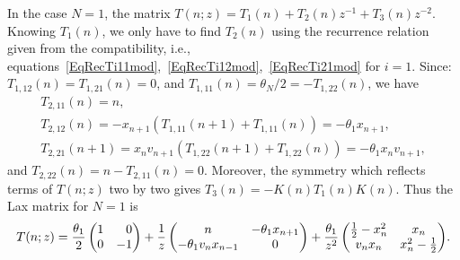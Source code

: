 \documentclass[pdftex]{sigma}%
\numberwithin{equation}{section}
\begin{document}
	\begin{Example} In the case $N=1$, the matrix $T(n;z)=T_1(n)+T_2(n)z^{-1}+T_3(n)z^{-2}$. Knowing $T_1(n)$, we only have to find $T_2(n)$ using the recurrence relation given from the compatibility, i.e., equations~\eqref{EqRecTi11mod},~\eqref{EqRecTi12mod},~\eqref{EqRecTi21mod} for $i=1$.
		Since: $T_{1,12}(n)=T_{1,21}(n)=0$, and $T_{1,11}(n)=\theta_N/2= -T_{1,22}(n)$, we have
\begin{gather*}
T_{2,11}(n)=n,
\\
T_{2,12}(n)=-x_{n+1}(T_{1,11}(n+1)+T_{1,11}(n))=-\theta_1x_{n+1},
\\
T_{2,21}(n+1)=x_nv_{n+1}(T_{1,22}(n+1)+T_{1,22}(n))=-\theta_1 x_nv_{n+1},
\end{gather*}
and $T_{2,22}(n)=n-T_{2,11}(n)=0$.
		Moreover, the symmetry which reflects terms of $T(n;z)$ two by two gives $T_3(n)=-K(n)T_1(n)K(n)$. Thus the Lax matrix for $N=1$ is
		\begin{equation*}
			T(n;z) = \dfrac{\theta_1}{2}\begin{pmatrix}
				1&\hphantom{-}0\\0&-1
			\end{pmatrix} + \frac{1}{z}\begin{pmatrix}
				n&-\theta_1x_{n+1}\\
				-\theta_1v_{n}x_{n-1}&0
			\end{pmatrix}+\frac{\theta_1}{z^2}\begin{pmatrix}
				\frac{1}{2}-x_n^2&x_n\\
				v_{n}x_n&x_n^2-\frac{1}{2}
			\end{pmatrix}\!.
		\end{equation*}
	\end{Example}
\end{document}
